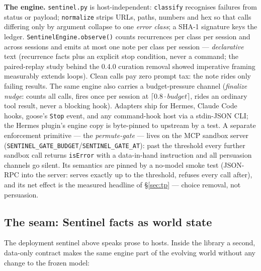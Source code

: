 \documentclass[11pt,a4paper]{article}
\newcommand{\hdr}[1]{\textbf{#1}}
\begin{document}
\hdr{The engine.} \texttt{sentinel.py} is host-independent:
\texttt{classify} recognises failures from status or payload;
\texttt{normalize} strips URLs, paths, numbers and hex so that calls
differing only by argument collapse to one \emph{error class}; a SHA-1
signature keys the ledger. \texttt{SentinelEngine.observe()} counts
recurrences per class per session and across sessions and emits at most one
note per class per session --- \emph{declarative} text (recurrence facts
plus an explicit stop condition, never a command; the paired-replay study behind the 0.4.0 curation removal showed imperative
framing measurably extends loops).
Clean calls pay zero prompt tax: the note rides only failing results. The
same engine also carries a budget-pressure channel (\emph{finalize nudge}:
counts all calls, fires once per session at $\lceil 0.8\cdot\mathit{budget}
\rceil$, rides an ordinary tool result, never a blocking hook). Adapters
ship for Hermes, Claude Code hooks, goose's \texttt{Stop} event, and any
command-hook host via a stdin-JSON CLI; the Hermes plugin's engine copy is
byte-pinned to upstream by a test. A separate enforcement primitive ---
the \emph{permute-gate} --- lives on the MCP sandbox server
(\texttt{SENTINEL\_GATE\_BUDGET}/\texttt{SENTINEL\_GATE\_AT}): past the
threshold every further sandbox call returns \texttt{isError} with a
data-in-hand instruction and all persuasion channels go silent. Its
semantics are pinned by a no-model smoke test (JSON-RPC into the server:
serves exactly up to the threshold, refuses every call after), and its net
effect is the measured headline of \S\ref{sec:tp} --- choice removal, not
persuasion.

\subsection{The seam: Sentinel facts as world state}
\label{sec:sentinel-seam}

The deployment sentinel above speaks prose to hosts. Inside the library a
second, data-only contract makes the same engine part of the evolving world
without any change to the frozen model:
\end{document}
